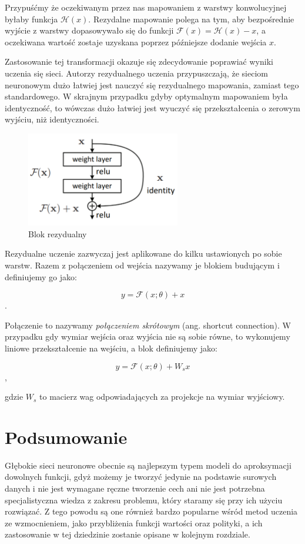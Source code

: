 \documentclass[licencjacka]{pracamgr}
\begin{document}
Przypuśćmy że oczekiwanym przez nas mapowaniem z warstwy konwolucyjnej byłaby funkcja $ \mathcal{H}(x) $. Rezydalne mapowanie polega na tym, aby bezpośrednie wyjście z warstwy dopasowywało się do funkcji $ \mathcal{F}(x) = \mathcal{H}(x) - x $, a oczekiwana wartość zostaje uzyskana poprzez późniejsze dodanie wejścia $x$. 

Zastosowanie tej transformacji okazuje się zdecydowanie poprawiać wyniki uczenia się sieci. Autorzy rezydualnego uczenia przypuszczają, że sieciom neuronowym dużo łatwiej jest nauczyć się rezydualnego mapowania, zamiast tego standardowego. W skrajnym przypadku gdyby optymalnym mapowaniem była identyczność, to wówczas dużo łatwiej jest wyuczyć się przekształcenia o zerowym wyjściu, niż identyczności.

\begin{figure}[ht!]
  \centering
  \includegraphics[width=0.6\textwidth]{res_block}
  \caption{Blok rezydualny}
\end{figure}

Rezydualne uczenie zazwyczaj jest aplikowane do kilku ustawionych po sobie warstw. Razem z połączeniem od wejścia nazywamy je blokiem budującym i definiujemy go jako:

$$ y = \mathcal{F}(x; \theta) + x $$.

Połączenie to nazywamy \emph{połączeniem skrótowym} (ang. shortcut connection). W przypadku gdy wymiar wejścia oraz wyjścia nie są sobie równe, to wykonujemy liniowe przekształcenie na wejściu, a blok definiujemy jako:

$$ y = \mathcal{F}(x; \theta) + W_sx $$,

gdzie $W_s$ to macierz wag odpowiadających za projekcje na wymiar wyjściowy.

\section{Podsumowanie}

Głębokie sieci neuronowe obecnie są najlepszym typem modeli do aproksymacji dowolnych funkcji, gdyż możemy je tworzyć jedynie na podstawie surowych danych i nie jest wymagane ręczne tworzenie cech ani nie jest potrzebna specjalistyczna wiedza z zakresu problemu, który staramy się przy ich użyciu rozwiązać. Z tego powodu są one również bardzo popularne wśród metod uczenia ze wzmocnieniem, jako przybliżenia funkcji wartości oraz polityki, a ich zastosowanie w tej dziedzinie zostanie opisane w kolejnym rozdziale.
\end{document}
